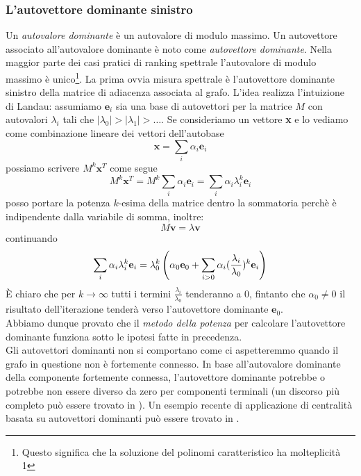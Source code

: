 \subsubsection{L'autovettore dominante sinistro}
Un \textit{autovalore dominante} è un autovalore di modulo massimo. Un autovettore associato all'autovalore dominante è noto come \textit{autovettore dominante}. Nella maggior parte dei casi pratici di ranking spettrale l'autovalore di modulo massimo è unico\footnote{Questo significa che la soluzione del polinomi caratteristico ha molteplicità 1}. La prima ovvia misura spettrale è l'autovettore dominante sinistro della matrice di adiacenza associata al grafo. L'idea realizza l'intuizione di Landau: assumiamo $\textbf{e}_i$ sia una base di autovettori per la matrice $M$ con autovalori $\lambda_i$ tali che $|\lambda_0| > |\lambda_1| > \dots$. Se consideriamo un vettore \textbf{x} e lo vediamo come combinazione lineare dei vettori dell'autobase
\begin{equation*}
    \textbf{x} = \sum_i{\alpha_i\textbf{e}_i}
\end{equation*}
possiamo scrivere $M^k\textbf{x}^T$ come segue
\begin{equation*}
    M^k\textbf{x}^T = M^k\sum_i{\alpha_i\textbf{e}_i} = \sum_i{\alpha_i \lambda_i^k \textbf{e}_i}
\end{equation*}
posso portare la potenza $k$-esima della matrice dentro la sommatoria perchè è indipendente dalla variabile di somma, inoltre:
\begin{equation*}
    M\textbf{v} = \lambda \textbf{v}
\end{equation*}
continuando
\begin{equation*}
    \sum_i{\alpha_i \lambda_i^k \textbf{e}_i} = \lambda_0^k\left(\alpha_0\textbf{e}_0 + \sum_{i > 0}{\alpha_i(\frac{\lambda_i}{\lambda_0})^k\textbf{e}_i}\right)
\end{equation*}
È chiaro che per $k \to \infty$ tutti i termini $\frac{\lambda_i}{\lambda_0}$ tenderanno a 0, fintanto che $\alpha_0 \neq 0$ il risultato dell'iterazione tenderà verso l'autovettore dominante $\textbf{e}_0$.\\
Abbiamo dunque provato che il \textit{metodo della potenza} per calcolare l'autovettore dominante funziona sotto le ipotesi fatte in precedenza.\\
Gli autovettori dominanti non si comportano come ci aspetteremmo quando il grafo in questione non è fortemente connesso. In base all'autovalore dominante della componente fortemente connessa, l'autovettore dominante potrebbe o potrebbe non essere diverso da zero per componenti terminali (un discorso più completo può essere trovato in %
). Un esempio recente di applicazione di centralità basata su autovettori dominanti può essere trovato in %
.
